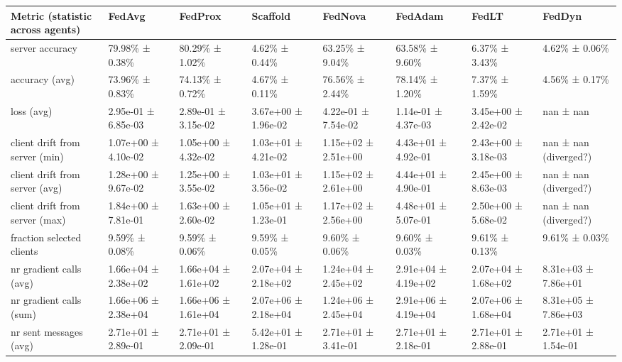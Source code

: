 \begin{tabular}{llllllll}
\hline
 Metric (statistic across agents)   & FedAvg              & FedProx             & Scaffold            & FedNova             & FedAdam             & FedLT               & FedDyn                \\
\hline
 server accuracy                    & 79.98\% ± 0.38\%      & 80.29\% ± 1.02\%      & 4.62\% ± 0.44\%       & 63.25\% ± 9.04\%      & 63.58\% ± 9.60\%      & 6.37\% ± 3.43\%       & 4.62\% ± 0.06\%         \\
 accuracy (avg)                     & 73.96\% ± 0.83\%      & 74.13\% ± 0.72\%      & 4.67\% ± 0.11\%       & 76.56\% ± 2.44\%      & 78.14\% ± 1.20\%      & 7.37\% ± 1.59\%       & 4.56\% ± 0.17\%         \\
 loss (avg)                         & 2.95e-01 ± 6.85e-03 & 2.89e-01 ± 3.15e-02 & 3.67e+00 ± 1.96e-02 & 4.22e-01 ± 7.54e-02 & 1.14e-01 ± 4.37e-03 & 3.45e+00 ± 2.42e-02 & nan ± nan             \\
 client drift from server (min)     & 1.07e+00 ± 4.10e-02 & 1.05e+00 ± 4.32e-02 & 1.03e+01 ± 4.21e-02 & 1.15e+02 ± 2.51e+00 & 4.43e+01 ± 4.92e-01 & 2.43e+00 ± 3.18e-03 & nan ± nan (diverged?) \\
 client drift from server (avg)     & 1.28e+00 ± 9.67e-02 & 1.25e+00 ± 3.55e-02 & 1.03e+01 ± 3.56e-02 & 1.15e+02 ± 2.61e+00 & 4.44e+01 ± 4.90e-01 & 2.45e+00 ± 8.63e-03 & nan ± nan (diverged?) \\
 client drift from server (max)     & 1.84e+00 ± 7.81e-01 & 1.63e+00 ± 2.60e-02 & 1.05e+01 ± 1.23e-01 & 1.17e+02 ± 2.56e+00 & 4.48e+01 ± 5.07e-01 & 2.50e+00 ± 5.68e-02 & nan ± nan (diverged?) \\
 fraction selected clients          & 9.59\% ± 0.08\%       & 9.59\% ± 0.06\%       & 9.59\% ± 0.05\%       & 9.60\% ± 0.06\%       & 9.60\% ± 0.03\%       & 9.61\% ± 0.13\%       & 9.61\% ± 0.03\%         \\
 nr gradient calls (avg)            & 1.66e+04 ± 2.38e+02 & 1.66e+04 ± 1.61e+02 & 2.07e+04 ± 2.18e+02 & 1.24e+04 ± 2.45e+02 & 2.91e+04 ± 4.19e+02 & 2.07e+04 ± 1.68e+02 & 8.31e+03 ± 7.86e+01   \\
 nr gradient calls (sum)            & 1.66e+06 ± 2.38e+04 & 1.66e+06 ± 1.61e+04 & 2.07e+06 ± 2.18e+04 & 1.24e+06 ± 2.45e+04 & 2.91e+06 ± 4.19e+04 & 2.07e+06 ± 1.68e+04 & 8.31e+05 ± 7.86e+03   \\
 nr sent messages (avg)             & 2.71e+01 ± 2.89e-01 & 2.71e+01 ± 2.09e-01 & 5.42e+01 ± 1.28e-01 & 2.71e+01 ± 3.41e-01 & 2.71e+01 ± 2.18e-01 & 2.71e+01 ± 2.88e-01 & 2.71e+01 ± 1.54e-01   \\

\end{tabular}
